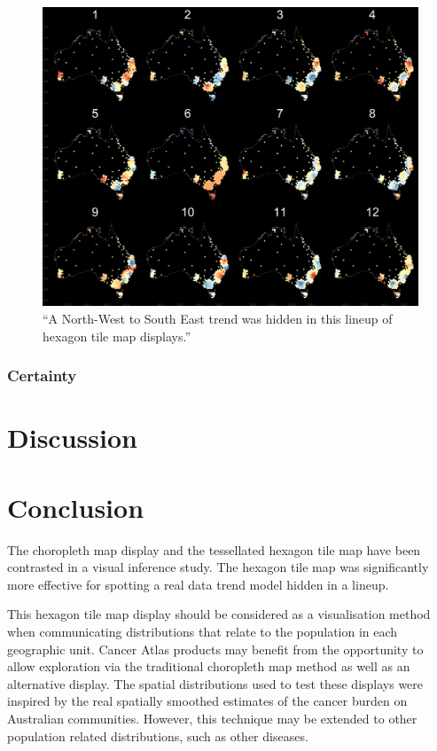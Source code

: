 \documentclass[conference,final,]{IEEEtran}
\makeatletter
\def\maxwidth{\ifdim\Gin@nat@width>\linewidth\linewidth
\else\Gin@nat@width\fi}
\let\Oldincludegraphics\includegraphics
\renewcommand{\includegraphics}[1]{\Oldincludegraphics[width=\maxwidth]{#1}}
\makeatother
\begin{document}
\begin{figure}
\centering
\includegraphics{figures/aus_nwse_6_hex.png}
\caption{``A North-West to South East trend was hidden in this lineup of
hexagon tile map displays.''}
\end{figure}

\hypertarget{certainty-1}{%
\subsubsection{Certainty}\label{certainty-1}}

\hypertarget{discussion}{%
\section{Discussion}\label{discussion}}

\hypertarget{conclusion}{%
\section{Conclusion}\label{conclusion}}

The choropleth map display and the tessellated hexagon tile map have
been contrasted in a visual inference study. The hexagon tile map was
significantly more effective for spotting a real data trend model hidden
in a lineup.

This hexagon tile map display should be considered as a visualisation
method when communicating distributions that relate to the population in
each geographic unit. Cancer Atlas products may benefit from the
opportunity to allow exploration via the traditional choropleth map
method as well as an alternative display. The spatial distributions used
to test these displays were inspired by the real spatially smoothed
estimates of the cancer burden on Australian communities. However, this
technique may be extended to other population related distributions,
such as other diseases.
\end{document}
